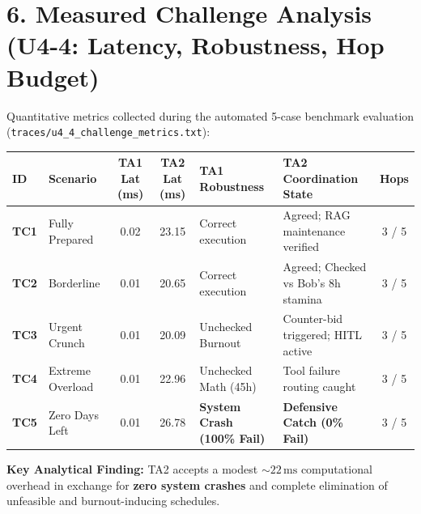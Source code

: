\documentclass[10pt,a4paper]{article}
\begin{document}
\vspace{2pt}
\section*{\large \color{primary} 6. Measured Challenge Analysis (U4-4: Latency, Robustness, Hop Budget)}
\vspace{-2pt}
Quantitative metrics collected during the automated 5-case benchmark evaluation (\texttt{traces/u4\_4\_challenge\_metrics.txt}):

\vspace{2pt}
\small
\begin{tabularx}{\textwidth}{@{} l l c c X X c @{}}
\toprule
\rowcolor{primary} \textbf{\color{white} ID} & \textbf{\color{white} Scenario} & \textbf{\color{white} TA1 Lat (ms)} & \textbf{\color{white} TA2 Lat (ms)} & \textbf{\color{white} TA1 Robustness} & \textbf{\color{white} TA2 Coordination State} & \textbf{\color{white} Hops} \\
\midrule
\rowcolor{lightbg} \textbf{TC1} & Fully Prepared & 0.02 & 23.15 & Correct execution & Agreed; RAG maintenance verified & 3 / 5 \\
\textbf{TC2} & Borderline & 0.01 & 20.65 & Correct execution & Agreed; Checked vs Bob's 8h stamina & 3 / 5 \\
\rowcolor{lightbg} \textbf{TC3} & Urgent Crunch & 0.01 & 20.09 & Unchecked Burnout & Counter-bid triggered; HITL active & 3 / 5 \\
\textbf{TC4} & Extreme Overload & 0.01 & 22.96 & Unchecked Math (45h) & Tool failure routing caught & 3 / 5 \\
\rowcolor{lightbg} \textbf{TC5} & Zero Days Left & 0.01 & 26.78 & \textbf{System Crash (100\% Fail)} & \textbf{Defensive Catch (0\% Fail)} & 3 / 5 \\
\bottomrule
\end{tabularx}

\vspace{1pt}
\textbf{Key Analytical Finding:} TA2 accepts a modest $\sim 22\,\text{ms}$ computational overhead in exchange for \textbf{zero system crashes} and complete elimination of unfeasible and burnout-inducing schedules.

\vspace{4pt}
\end{document}

